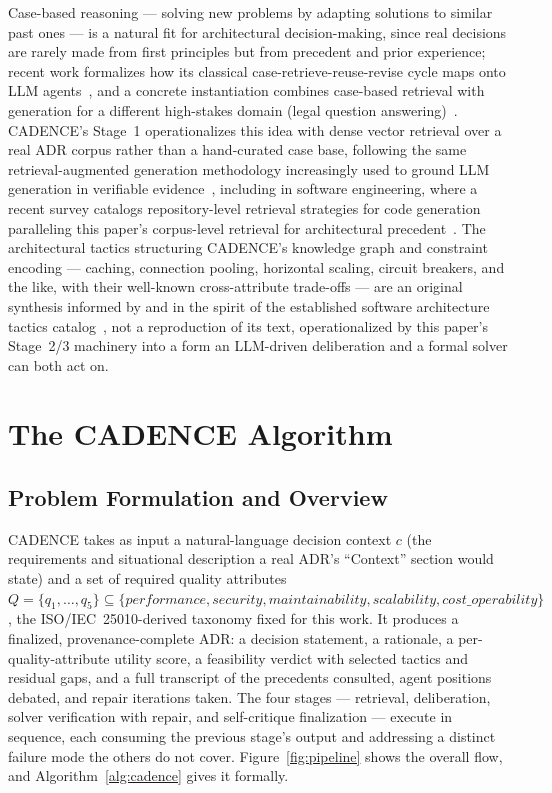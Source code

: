 \documentclass[lettersize,journal]{IEEEtran}
\begin{document}
Case-based reasoning --- solving new problems by adapting solutions to similar past ones --- is a natural fit for architectural decision-making, since real decisions are rarely made from first principles but from precedent and prior experience; recent work formalizes how its classical case-retrieve-reuse-revise cycle maps onto LLM agents~\cite{hatalis2025cbrllm}, and a concrete instantiation combines case-based retrieval with generation for a different high-stakes domain (legal question answering)~\cite{wiratunga2024cbrrag}. CADENCE's Stage~1 operationalizes this idea with dense vector retrieval over a real ADR corpus rather than a hand-curated case base, following the same retrieval-augmented generation methodology increasingly used to ground LLM generation in verifiable evidence~\cite{lewis2020rag}, including in software engineering, where a recent survey catalogs repository-level retrieval strategies for code generation paralleling this paper's corpus-level retrieval for architectural precedent~\cite{tao2025ragcode}. The architectural tactics structuring CADENCE's knowledge graph and constraint encoding --- caching, connection pooling, horizontal scaling, circuit breakers, and the like, with their well-known cross-attribute trade-offs --- are an original synthesis informed by and in the spirit of the established software architecture tactics catalog~\cite{bass2021saip}, not a reproduction of its text, operationalized by this paper's Stage~2/3 machinery into a form an LLM-driven deliberation and a formal solver can both act on.

\section{The CADENCE Algorithm}
\label{sec:method}

\subsection{Problem Formulation and Overview}

CADENCE takes as input a natural-language decision context $c$ (the requirements and situational description a real ADR's ``Context'' section would state) and a set of required quality attributes $Q = \{q_1, \ldots, q_5\} \subseteq \{\textit{performance}, \textit{security}, \textit{maintainability}, \textit{scalability}, \textit{cost\_operability}\}$, the ISO/IEC~25010-derived taxonomy fixed for this work. It produces a finalized, provenance-complete ADR: a decision statement, a rationale, a per-quality-attribute utility score, a feasibility verdict with selected tactics and residual gaps, and a full transcript of the precedents consulted, agent positions debated, and repair iterations taken. The four stages --- retrieval, deliberation, solver verification with repair, and self-critique finalization --- execute in sequence, each consuming the previous stage's output and addressing a distinct failure mode the others do not cover. Figure~\ref{fig:pipeline} shows the overall flow, and Algorithm~\ref{alg:cadence} gives it formally.
\end{document}
